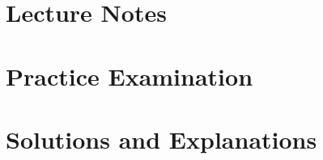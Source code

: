 \documentclass[11pt,a4paper,openany,oneside]{book}
\begin{document}
\frontmatter


\mainmatter
\part{Lecture Notes}







\part{Practice Examination}





\part{Solutions and Explanations}




\appendix


\backmatter

\end{document}
